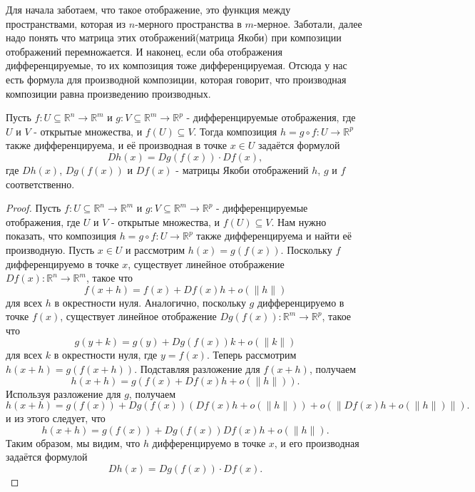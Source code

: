 


Для начала заботаем, что такое отображение, это функция между пространствами, которая из $n$-мерного пространства в $m$-мерное. Заботали, далее надо понять что матрица этих отображений(матрица Якоби) при композиции отображений перемножается. И наконец, если оба отображения дифференцируемые, то их композиция тоже дифференцируемая. Отсюда у нас есть формула для производной композиции, которая говорит, что производная композиции равна произведению производных.
\begin{theorem}
Пусть $f: U \subseteq \mathbb{R}^n \to \mathbb{R}^m$ и $g: V \subseteq \mathbb{R}^m \to \mathbb{R}^p$ - дифференцируемые отображения, где $U$ и $V$ - открытые множества, и $f(U) \subseteq V$. Тогда композиция $h = g \circ f: U \to \mathbb{R}^p$ также дифференцируема, и её производная в точке $x \in U$ задаётся формулой
\[Dh(x) = Dg(f(x)) \cdot Df(x),\]
где $Dh(x)$, $Dg(f(x))$ и $Df(x)$ - матрицы Якоби отображений $h$, $g$ и $f$ соответственно.  
\end{theorem}

\begin{proof}
Пусть $f: U \subseteq \mathbb{R}^n \to \mathbb{R}^m$ и $g: V \subseteq \mathbb{R}^m \to \mathbb{R}^p$ - дифференцируемые отображения, где $U$ и $V$ - открытые множества, и $f(U) \subseteq V$. Нам нужно показать, что композиция $h = g \circ f: U \to \mathbb{R}^p$ также дифференцируема и найти её производную.
Пусть $x \in U$ и рассмотрим $h(x) = g(f(x))$. Поскольку $f$ дифференцируемо в точке $x$, существует линейное отображение $Df(x): \mathbb{R}^n \to \mathbb{R}^m$, такое что
\[f(x + h) = f(x) + Df(x)h + o(\|h\|)\]
для всех $h$ в окрестности нуля. Аналогично, поскольку $g$ дифференцируемо в точке $f(x)$, существует линейное отображение $Dg(f(x)): \mathbb{R}^m \to \mathbb{R}^p$, такое что
\[g(y + k) = g(y) + Dg(f(x))k + o(\|k\|)\]
для всех $k$ в окрестности нуля, где $y = f(x)$.
Теперь рассмотрим $h(x + h) = g(f(x + h))$. Подставляя разложение для $f(x + h)$, получаем
\[h(x + h) = g(f(x) + Df(x)h + o(\|h\|)).\]
Используя разложение для $g$, получаем
\[h(x + h) = g(f(x)) + Dg(f(x))(Df(x)h + o(\|h\|)) + o(\|Df(x)h + o(\|h\|)\|).\]  и из этого следует, что
\[h(x + h) = g(f(x)) + Dg(f(x))Df(x)h + o(\|h\|).\]
Таким образом, мы видим, что $h$ дифференцируемо в точке $x$, и его производная задаётся формулой
\[Dh(x) = Dg(f(x)) \cdot Df(x).\]
\end{proof}




